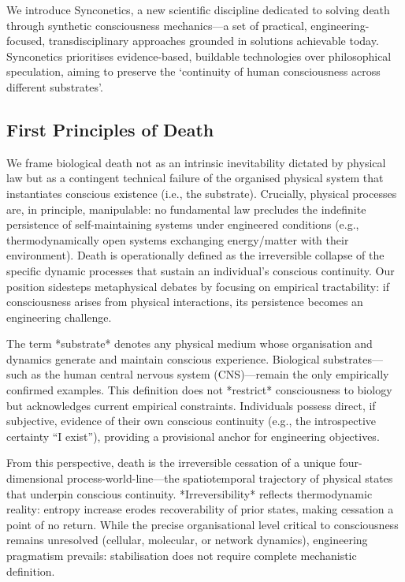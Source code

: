 \documentclass[10pt]{article}
\begin{document}
\begin{sloppypar}
  We introduce Synconetics, a new scientific discipline dedicated to solving death through synthetic consciousness mechanics—a set of practical, engineering-focused, transdisciplinary approaches grounded in solutions achievable today. Synconetics prioritises evidence-based, buildable technologies over philosophical speculation, aiming to preserve the ‘continuity of human consciousness across different substrates’.

  \subsection{First Principles of Death}
  \label{sec:first-principles}

  We frame biological death not as an intrinsic inevitability dictated by physical law but as a contingent technical failure of the organised physical system that instantiates conscious existence (i.e., the substrate). Crucially, physical processes are, in principle, manipulable: no fundamental law precludes the indefinite persistence of self-maintaining systems under engineered conditions (e.g., thermodynamically open systems exchanging energy/matter with their environment). Death is operationally defined as the irreversible collapse of the specific dynamic processes that sustain an individual’s conscious continuity. Our position sidesteps metaphysical debates by focusing on empirical tractability: if consciousness arises from physical interactions, its persistence becomes an engineering challenge.

  The term *substrate* denotes any physical medium whose organisation and dynamics generate and maintain conscious experience. Biological substrates—such as the human central nervous system (CNS)—remain the only empirically confirmed examples. This definition does not *restrict* consciousness to biology but acknowledges current empirical constraints. Individuals possess direct, if subjective, evidence of their own conscious continuity (e.g., the introspective certainty “I exist”), providing a provisional anchor for engineering objectives.

  From this perspective, death is the irreversible cessation of a unique four-dimensional process-world-line—the spatiotemporal trajectory of physical states that underpin conscious continuity. *Irreversibility* reflects thermodynamic reality: entropy increase erodes recoverability of prior states, making cessation a point of no return. While the precise organisational level critical to consciousness remains unresolved (cellular, molecular, or network dynamics), engineering pragmatism prevails: stabilisation does not require complete mechanistic definition.


\end{sloppypar}
\end{document}
